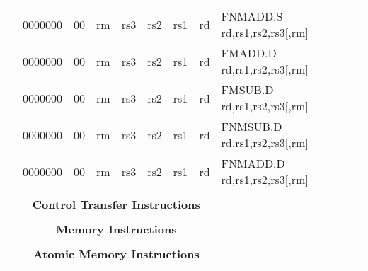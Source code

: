 \begin{table}[p]
\begin{small}
\begin{center}
\begin{tabular}{rcccccccccl}
&
\multicolumn{1}{|c|}{0000000} &
\multicolumn{1}{c|}{00} &
\multicolumn{2}{c|}{rm} &
\multicolumn{2}{c|}{rs3} &
\multicolumn{1}{c|}{rs2} &
\multicolumn{1}{c|}{rs1} &
\multicolumn{1}{c|}{rd} & FNMADD.S rd,rs1,rs2,rs3[,rm] \\
\cline{2-10}
  

&
\multicolumn{1}{|c|}{0000000} &
\multicolumn{1}{c|}{00} &
\multicolumn{2}{c|}{rm} &
\multicolumn{2}{c|}{rs3} &
\multicolumn{1}{c|}{rs2} &
\multicolumn{1}{c|}{rs1} &
\multicolumn{1}{c|}{rd} & FMADD.D rd,rs1,rs2,rs3[,rm] \\
\cline{2-10}
  

&
\multicolumn{1}{|c|}{0000000} &
\multicolumn{1}{c|}{00} &
\multicolumn{2}{c|}{rm} &
\multicolumn{2}{c|}{rs3} &
\multicolumn{1}{c|}{rs2} &
\multicolumn{1}{c|}{rs1} &
\multicolumn{1}{c|}{rd} & FMSUB.D rd,rs1,rs2,rs3[,rm] \\
\cline{2-10}
  

&
\multicolumn{1}{|c|}{0000000} &
\multicolumn{1}{c|}{00} &
\multicolumn{2}{c|}{rm} &
\multicolumn{2}{c|}{rs3} &
\multicolumn{1}{c|}{rs2} &
\multicolumn{1}{c|}{rs1} &
\multicolumn{1}{c|}{rd} & FNMSUB.D rd,rs1,rs2,rs3[,rm] \\
\cline{2-10}
  

&
\multicolumn{1}{|c|}{0000000} &
\multicolumn{1}{c|}{00} &
\multicolumn{2}{c|}{rm} &
\multicolumn{2}{c|}{rs3} &
\multicolumn{1}{c|}{rs2} &
\multicolumn{1}{c|}{rs1} &
\multicolumn{1}{c|}{rd} & FNMADD.D rd,rs1,rs2,rs3[,rm] \\
\cline{2-10}
  

&
\multicolumn{9}{c}{} & \\
&
\multicolumn{9}{c}{\bf Control Transfer Instructions} & \\
\cline{2-10}
  

&
\multicolumn{9}{c}{} & \\
&
\multicolumn{9}{c}{\bf Memory Instructions} & \\
\cline{2-10}
  

&
\multicolumn{9}{c}{} & \\
&
\multicolumn{9}{c}{\bf Atomic Memory Instructions} & \\
\cline{2-10}
  

\end{tabular}
\end{center}
\end{small}

\label{instr-table}
\end{table}
  

\newpage

